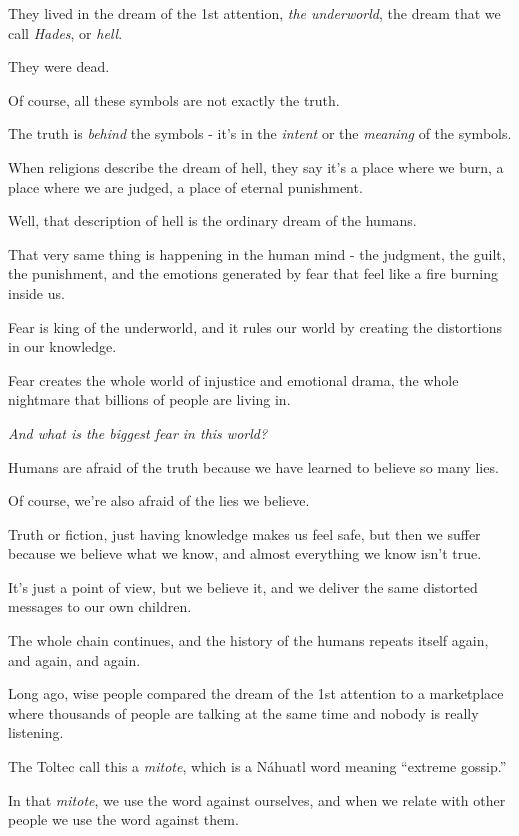 \documentclass{article}
\numberwithin{equation}{section}
\begin{document}
They lived in the dream of the 1st attention, \textit{the underworld}, the dream that we call \textit{Hades}, or \textit{hell}.

They were dead.

%
Of course, all these symbols are not exactly the truth.

The truth is \textit{behind} the symbols - it's in the \textit{intent} or the \textit{meaning} of the symbols.

When religions describe the dream of hell, they say it's a place where we burn, a place where we are judged, a place of eternal punishment.

Well, that description of hell is the ordinary dream of the humans.

That very same thing is happening in the human mind - the judgment, the guilt, the punishment, and the emotions generated by fear that feel like a fire burning inside us.

Fear is king of the underworld, and it rules our world by creating the distortions in our knowledge.

Fear creates the whole world of injustice and emotional drama, the whole nightmare that billions of people are living in.

%
\textit{And what is the biggest fear in this world?}


Humans are afraid of the truth because we have learned to believe so many lies.

Of course, we're also afraid of the lies we believe.

Truth or fiction, just having knowledge makes us feel safe, but then we suffer because we believe what we know, and almost everything we know isn't true.

It's just a point of view, but we believe it, and we deliver the same distorted messages to our own children.

The whole chain continues, and the history of the humans repeats itself again, and again, and again.

%
Long ago, wise people compared the dream of the 1st attention to a marketplace where thousands of people are talking at the same time and nobody is really listening.

The Toltec call this a \textit{mitote}, which is a N\'ahuatl word meaning ``extreme gossip.''

In that \textit{mitote}, we use the word against ourselves, and when we relate with other people we use the word against them.
\end{document}
